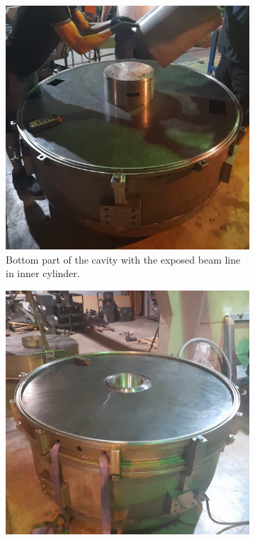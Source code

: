 \documentclass[a4paper,oneside,12pt]{report}
\numberwithin{equation}{chapter}
\begin{document}
{\iffalse \begin{figure}
    \centering
    \begin{subfigure}{.5\textwidth}
      \centering
      \includegraphics[width=.96\linewidth]{./figures/manif/toroidal_sheets/rhodo_bottom_cropped.jpeg}
      \caption{Bottom part of the cavity with the exposed beam line in inner cylinder.}
    \end{subfigure}%
    \centering
    \begin{subfigure}{.5\textwidth}
      \centering
      \includegraphics[width=.96\linewidth]{./figures/manif/toroidal_sheets/rhodo_middle_toroidal_sheets_welded_cropped.jpeg}

\end{subfigure}
\end{figure}}
\end{document}
